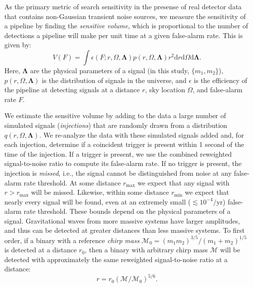 As the primary metric of search sensitivity in the presense of real detector
data that contains non-Gaussian transient noise sources, we measure the sensitivity of a 
pipeline by finding the \emph{sensitive
volume}, which is proportional to the number of detections a pipeline will
make per unit time at a given false-alarm rate. This is given by:
\begin{equation}
V(F) = \int \epsilon(F; r, \Omega, \mathbf{\Lambda}) p(r, \Omega, \mathbf{\Lambda}) r^2 \mathrm{d}r \mathrm{d}\Omega \mathrm{d}\mathbf{\Lambda}.
\end{equation}
Here, $\mathbf{\Lambda}$ are the physical parameters of a signal (in this
study, $\{m_1, m_2\}$), $p(r, \Omega, \mathbf{\Lambda})$ is the distribution of
signals in the universe, and $\epsilon$ is the efficiency of the pipeline at
detecting signals at a distance $r$, sky location $\Omega$, and false-alarm
rate $F$.

We estimate the sensitive volume by adding to the data a large number of
simulated signals (\emph{injections}) that are randomly drawn from a
distribution $q(r, \Omega, \mathbf{\Lambda})$. We re-analyze the data with 
these simulated signals added and,
for each injection, determine if a coincident trigger is present within 1
second of the time of the injection. If a trigger is present, we use the
combined reweighted signal-to-noise ratio to compute its false-alarm rate. 
If no trigger is present, the injection is
\emph{missed}, i.e., the signal cannot be distinguished from noise at any
false-alarm rate
threshold. At some distance $r_{\max}$ we expect that any signal with $r >
r_{\max}$ will be missed.  Likewise, within some distance $r_{\min}$ we expect
that nearly every signal will be
found, even at an extremely small ($\lesssim 10^{-4} / \mathrm{yr}$)
false-alarm rate
threshold. These bounds depend on the physical parameters of a signal.
Gravitational waves from more massive systems have larger amplitudes, and thus
can be detected at greater distances than less massive systems. To first order,
if a binary with a reference \emph{chirp mass} $\mathcal{M}_0 = (m_1
m_2)^{3/5}/(m_1 + m_2)^{1/5}$ is detected at a distance $r_0$, then a binary
with arbitrary chirp mass $\mathcal{M}$ will be detected with approximately the
same reweighted signal-to-noise ratio at a distance:
\begin{equation}
r = r_{0}(\mathcal{M}/\mathcal{M}_{0})^{5/6}.
\label{eqn:chirp_distance}
\end{equation}

